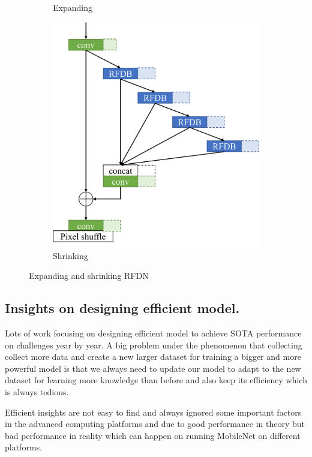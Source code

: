 \documentclass[10pt,twocolumn,letterpaper]{article}
\begin{document}
\begin{figure}
\begin{subfigure}[b]{0.49\linewidth}
        \caption{Expanding}
        \label{fig:Expanding}
    \end{subfigure}
    \begin{subfigure}[b]{0.49\linewidth}
		\centering
        \includegraphics[width=\textwidth]{../shrink.pdf}
        \caption{Shrinking}
        \label{fig:Shrinking}
    \end{subfigure}
    \caption{Expanding and shrinking RFDN}
    \label{fig:PRFDN}
\end{figure}

\subsection{Insights on designing efficient model.}
Lots of work focusing on designing efficient model to achieve SOTA performance on challenges year by year. A big problem under the phenomenon that collecting collect more data and create a new larger dataset for training a bigger and more powerful model is that we always need to update our model to adapt to the new dataset for learning more knowledge than before and also keep its efficiency which is always tedious.

Efficient insights are not easy to find and always ignored some important factors in the advanced computing platforms and due to good performance in theory but bad performance in reality which can happen on running MobileNet\cite{sandler2018mobilenetv2} on different platforms.
\end{document}
